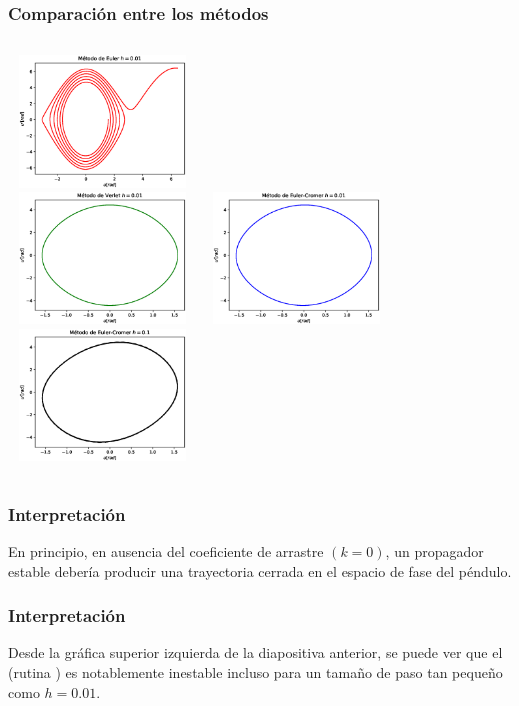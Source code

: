 \begin{frame}
\frametitle{Comparación entre los métodos}
\begin{columns}[t]
\centering
\includegraphics[width=5cm,height=3.5cm]{Imagenes/metodo_EDO2_Euler_01.eps}\\
\includegraphics[width=5cm,height=3.5cm]{Imagenes/metodo_EDO2_Verlet_01.eps}
\centering
\includegraphics[width=5cm,height=3.5cm]{Imagenes/metodo_EDO2_Euler_Cromer_01.eps}\\
\includegraphics[width=5cm,height=3.5cm]{Imagenes/metodo_EDO2_Euler_Cromer_02.eps}
\end{columns}
\end{frame}
\begin{frame}
\frametitle{Interpretación}
En principio, en ausencia del coeficiente de arrastre $(k = 0)$, un propagador estable debería producir una trayectoria cerrada en el espacio de fase del péndulo.
\end{frame}
\begin{frame}
\frametitle{Interpretación}
Desde la gráfica superior izquierda de la diapositiva anterior, se puede ver que el  (rutina ) es notablemente inestable incluso para un tamaño de paso tan pequeño como $h = 0.01$.
\end{frame}
